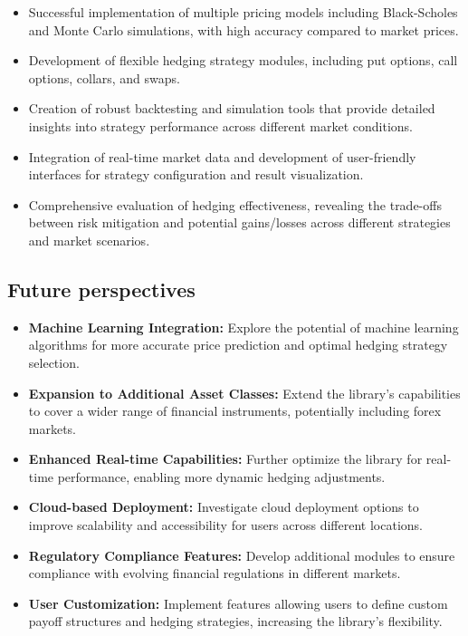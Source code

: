 \documentclass[12pt]{article}
\begin{document}
\begin{itemize}
    \item Successful implementation of multiple pricing models including Black-Scholes and Monte Carlo simulations, with high accuracy compared to market prices.
    \item Development of flexible hedging strategy modules, including put options, call options, collars, and swaps.
    \item Creation of robust backtesting and simulation tools that provide detailed insights into strategy performance across different market conditions.
    \item Integration of real-time market data and development of user-friendly interfaces for strategy configuration and result visualization.
    \item Comprehensive evaluation of hedging effectiveness, revealing the trade-offs between risk mitigation and potential gains/losses across different strategies and market scenarios.
\end{itemize}

\subsection{Future perspectives}

\begin{itemize}
    \item \textbf{Machine Learning Integration:} Explore the potential of machine learning algorithms for more accurate price prediction and optimal hedging strategy selection.
    \item \textbf{Expansion to Additional Asset Classes:} Extend the library's capabilities to cover a wider range of financial instruments, potentially including forex markets.
    \item \textbf{Enhanced Real-time Capabilities:} Further optimize the library for real-time performance, enabling more dynamic hedging adjustments.
    \item \textbf{Cloud-based Deployment:} Investigate cloud deployment options to improve scalability and accessibility for users across different locations.
    \item \textbf{Regulatory Compliance Features:} Develop additional modules to ensure compliance with evolving financial regulations in different markets.
    \item \textbf{User Customization:} Implement features allowing users to define custom payoff structures and hedging strategies, increasing the library's flexibility.
\end{itemize}
\end{document}
